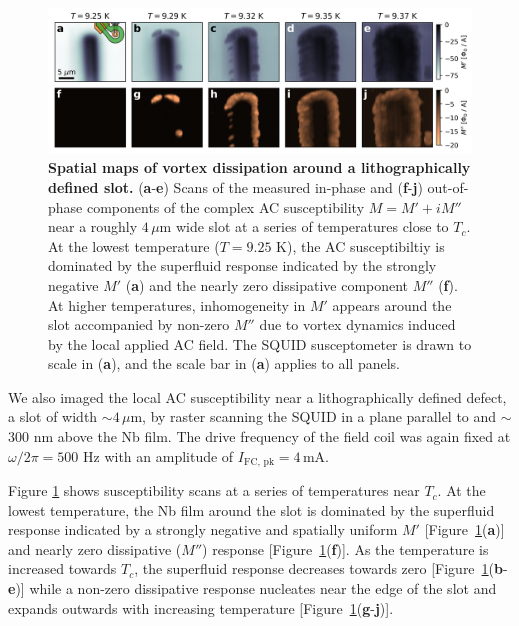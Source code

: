\documentclass[%
 reprint,
 superscriptaddress,
 amsmath,
 amssymb,
 amsfonts,
 aps,
 prb,
]{revtex4-2}
\newcommand{\Tc}{T_c}
\newcommand{\FC}{\mathrm{FC}}
\newcommand{\pk}{\mathrm{pk}}
\newcommand{\mA}{\mathrm{mA}}
\newcommand{\um}{\mu\mathrm{m}}
\begin{document}
\begin{figure}
    \centering
    \includegraphics[width=\linewidth]{figures/susc_Tseries_scans-3.png}
    \caption{{\bf Spatial maps of vortex dissipation around a lithographically defined slot.} ({\bf a}-{\bf e}) Scans of the measured in-phase and ({\bf f}-{\bf j}) out-of-phase components of the complex AC susceptibility $M = M'+iM''$ near a roughly $4\,\um$ wide slot at a series of temperatures close to $T_c$. At the lowest temperature ($T=9.25$ K), the AC susceptibiltiy is dominated by the superfluid response indicated by the strongly negative $M'$ ({\bf a}) and the nearly zero dissipative component $M''$ ({\bf f}). At higher temperatures, inhomogeneity in $M'$ appears around the slot accompanied by non-zero $M''$ due to vortex dynamics induced by the local applied AC field. The SQUID susceptometer is drawn to scale in ({\bf a}), and the scale bar in ({\bf a}) applies to all panels.}
    \label{fig:SUSC_Tseries_scans}
\end{figure}

We also imaged the local AC susceptibility near a lithographically defined defect, a slot of width $\sim4\,\um$, by raster scanning the SQUID in a plane parallel to and $\sim$300 nm above the Nb film. The drive frequency of the field coil was again fixed at $\omega/2\pi=500$ Hz with an amplitude of $I_{\FC,\,\pk} = 4\,\mA$.

Figure \ref{fig:SUSC_Tseries_scans} shows susceptibility scans at a series of temperatures near $T_c$. At the lowest temperature, the Nb film around the slot is dominated by the superfluid response indicated by a strongly negative and spatially uniform $M'$
[Figure~\ref{fig:SUSC_Tseries_scans}({\bf a})] and nearly zero dissipative ($M''$) response [Figure~\ref{fig:SUSC_Tseries_scans}({\bf f})]. As the temperature is increased towards $\Tc$, the superfluid response decreases towards zero [Figure~\ref{fig:SUSC_Tseries_scans}({\bf b}-{\bf e})] while a non-zero dissipative response nucleates near the edge of the slot and expands outwards with increasing temperature [Figure~\ref{fig:SUSC_Tseries_scans}({\bf g}-{\bf j})].
\end{document}
